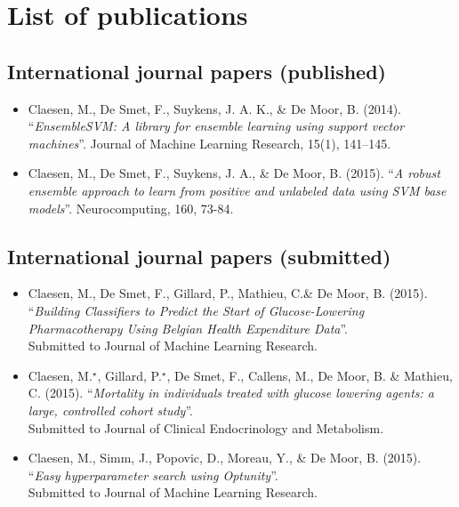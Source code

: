 \chapter{List of publications}

\section*{International journal papers (published)}

\begin{itemize}
\item Claesen, M., De Smet, F., Suykens, J. A. K., \& De Moor, B. (2014). ``\emph{EnsembleSVM: A library for ensemble learning using support vector machines}''. Journal of Machine Learning Research, 15(1), 141--145.
\item Claesen, M., De Smet, F., Suykens, J. A., \& De Moor, B. (2015). ``\emph{A robust ensemble approach to learn from positive and unlabeled data using SVM base models}''.
Neurocomputing, 160, 73-84.
\end{itemize}

\section*{International journal papers (submitted)}
\begin{itemize}
\item Claesen, M., De Smet, F., Gillard, P., Mathieu, C.\& De Moor, B. (2015). ``\emph{Building Classifiers to Predict the Start of Glucose-Lowering Pharmacotherapy Using Belgian Health Expenditure Data}''. \\ 
        Submitted to Journal of Machine Learning Research.
\item Claesen, M.$^\star$, Gillard, P.$^\star$, De Smet, F., Callens, M., De Moor, B. \& Mathieu, C. (2015). ``\emph{Mortality in individuals treated with glucose lowering agents: a large, controlled cohort study}''. \\ 
        Submitted to Journal of Clinical Endocrinology and Metabolism.
\item Claesen, M., Simm, J., Popovic, D., Moreau, Y., \& De Moor, B. (2015). ``\emph{Easy hyperparameter search using Optunity}''. \\
        Submitted to Journal of Machine Learning Research.
\end{itemize}

